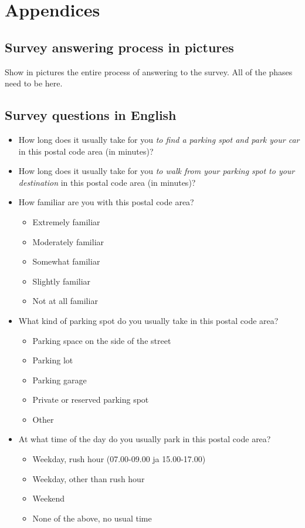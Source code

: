 \section{Appendices}

\subsection{Survey answering process in pictures}
\justify Show in pictures the entire process of answering to the survey. All of the phases need to be here.

\subsection{Survey questions in English}
\justify
\begin{spacing}{1}
    \begin{itemize}
        \item How long does it usually take for you \textit{to find a parking spot and park your car} in this postal code area (in minutes)?
        \item How long does it usually take for you \textit{to walk from your parking spot to your destination} in this postal code area (in minutes)?
        \item How familiar are you with this postal code area?
        \begin{itemize}
            \item Extremely familiar
            \item Moderately familiar
            \item Somewhat familiar
            \item Slightly familiar
            \item Not at all familiar
        \end{itemize}
        \item What kind of parking spot do you usually take in this postal code area?
        \begin{itemize}
            \item Parking space on the side of the street
            \item Parking lot
            \item Parking garage
            \item Private or reserved parking spot
            \item Other
        \end{itemize}
        \item At what time of the day do you usually park in this postal code area?
        \begin{itemize}
            \item Weekday, rush hour (07.00-09.00 ja 15.00-17.00)
            \item Weekday, other than rush hour
            \item Weekend
            \item None of the above, no usual time
        \end{itemize}
    \end{itemize}
\end{spacing}

